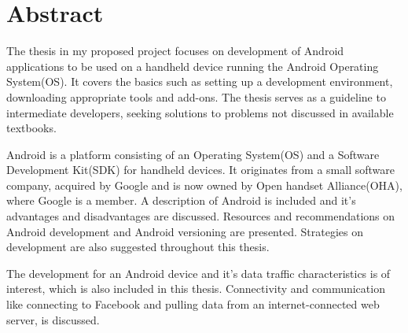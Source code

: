 \chapter*{Abstract}
\bigskip
\begin{onehalfspace}

The thesis in my proposed project focuses on development of Android applications to be used on a handheld device running the Android Operating System(OS). It covers the basics such as setting up a development environment, downloading appropriate tools and add-ons. The thesis serves as a guideline to intermediate developers, seeking solutions to problems not discussed in available textbooks.
   
\noindent
Android is a platform consisting of an Operating System(OS) and a Software Development Kit(SDK) for handheld devices. It originates from a small software company, acquired by Google and is now owned by Open handset Alliance(OHA), where Google is a member. A description of Android is included and it's advantages and disadvantages are discussed. Resources and recommendations on Android development and Android versioning are presented. Strategies on development are also suggested throughout this thesis.

\noindent
The development for an Android device and it's data traffic characteristics is of interest, which is also included in this thesis.
Connectivity and communication like connecting to Facebook and pulling data from an internet-connected web server, is discussed.

\end{onehalfspace}




\bigskip




